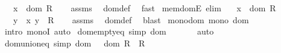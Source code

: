 \begin{isabellebody}
\ \ \ {\isachardoublequoteopen}x\ {\isasymin}\ dom\ R{\isachardoublequoteclose}\isanewline
%
\isadelimproof
\ \ %
\endisadelimproof
%
\isatagproof
{}\isamarkupfalse%
\ assms\ \isamarkupfalse%
\ dom{\isacharunderscore}{\kern0pt}def\ \isamarkupfalse%
\ fast%
\endisatagproof
{\isafoldproof}%
%
\isadelimproof
\isanewline
%
\endisadelimproof
\isanewline
{}\isamarkupfalse%
\ mem{\isacharunderscore}{\kern0pt}domE\ {\isacharbrackleft}{\kern0pt}elim{\isacharbang}{\kern0pt}{\isacharbrackright}{\kern0pt}{\isacharcolon}{\kern0pt}\isanewline
\ \ \ {\isachardoublequoteopen}x\ {\isasymin}\ dom\ R{\isachardoublequoteclose}\isanewline
\ \ \ y\ \ {\isachardoublequoteopen}{\isasymlangle}x{\isacharcomma}{\kern0pt}\ y{\isasymrangle}\ {\isasymin}\ R{\isachardoublequoteclose}\isanewline
%
\isadelimproof
\ \ %
\endisadelimproof
%
\isatagproof
{}\isamarkupfalse%
\ assms\ \isamarkupfalse%
\ dom{\isacharunderscore}{\kern0pt}def\ \isamarkupfalse%
\ blast%
\endisatagproof
{\isafoldproof}%
%
\isadelimproof
\isanewline
%
\endisadelimproof
\isanewline
{}\isamarkupfalse%
\ mono{\isacharunderscore}{\kern0pt}dom{\isacharcolon}{\kern0pt}\ {\isachardoublequoteopen}mono\ dom{\isachardoublequoteclose}\isanewline
%
\isadelimproof
\ \ %
\endisadelimproof
%
\isatagproof
{}\isamarkupfalse%
\ {\isacharparenleft}{\kern0pt}intro\ monoI{\isacharparenright}{\kern0pt}\ auto%
\endisatagproof
{\isafoldproof}%
%
\isadelimproof
\isanewline
%
\endisadelimproof
\isanewline
{}\isamarkupfalse%
\ dom{\isacharunderscore}{\kern0pt}empty{\isacharunderscore}{\kern0pt}eq\ {\isacharbrackleft}{\kern0pt}simp{\isacharbrackright}{\kern0pt}{\isacharcolon}{\kern0pt}\ {\isachardoublequoteopen}dom\ {\isacharbraceleft}{\kern0pt}{\isacharbraceright}{\kern0pt}\ {\isacharequal}{\kern0pt}\ {\isacharbraceleft}{\kern0pt}{\isacharbraceright}{\kern0pt}{\isachardoublequoteclose}\isanewline
%
\isadelimproof
\ \ %
\endisadelimproof
%
\isatagproof
{}\isamarkupfalse%
\ auto%
\endisatagproof
{\isafoldproof}%
%
\isadelimproof
\isanewline
%
\endisadelimproof
\isanewline
{}\isamarkupfalse%
\ dom{\isacharunderscore}{\kern0pt}union{\isacharunderscore}{\kern0pt}eq\ {\isacharbrackleft}{\kern0pt}simp{\isacharbrackright}{\kern0pt}{\isacharcolon}{\kern0pt}\ {\isachardoublequoteopen}dom\ {\isacharparenleft}{\kern0pt}{\isasymUnion}{\isasymR}{\isacharparenright}{\kern0pt}\ {\isacharequal}{\kern0pt}\ {\isasymUnion}{\isacharbraceleft}{\kern0pt}dom\ R\ {\isacharbar}{\kern0pt}\ R\ {\isasymin}\ {\isasymR}{\isacharbraceright}{\kern0pt}{\isachardoublequoteclose}\isanewline

\end{isabellebody}
